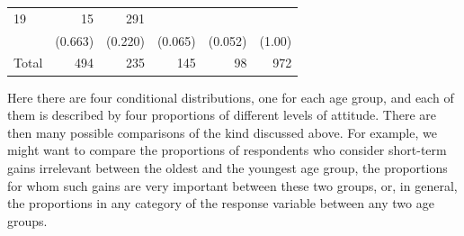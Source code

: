 \documentclass[11pt,a4paper,openany]{book}
\begin{document}
\begin{longtable}[]{@{}lrrrrr@{}}
\begin{minipage}[t]{0.09\columnwidth}
19\strut
\end{minipage} & \begin{minipage}[t]{0.09\columnwidth}\raggedleft\strut
15\strut
\end{minipage} & \begin{minipage}[t]{0.06\columnwidth}\raggedleft\strut
291\strut
\end{minipage}\tabularnewline
\begin{minipage}[t]{0.10\columnwidth}\raggedright\strut
\strut
\end{minipage} & \begin{minipage}[t]{0.40\columnwidth}\raggedleft\strut
(0.663)\strut
\end{minipage} & \begin{minipage}[t]{0.09\columnwidth}\raggedleft\strut
(0.220)\strut
\end{minipage} & \begin{minipage}[t]{0.09\columnwidth}\raggedleft\strut
(0.065)\strut
\end{minipage} & \begin{minipage}[t]{0.09\columnwidth}\raggedleft\strut
(0.052)\strut
\end{minipage} & \begin{minipage}[t]{0.06\columnwidth}\raggedleft\strut
(1.00)\strut
\end{minipage}\tabularnewline
\begin{minipage}[t]{0.10\columnwidth}\raggedright\strut
Total\strut
\end{minipage} & \begin{minipage}[t]{0.40\columnwidth}\raggedleft\strut
494\strut
\end{minipage} & \begin{minipage}[t]{0.09\columnwidth}\raggedleft\strut
235\strut
\end{minipage} & \begin{minipage}[t]{0.09\columnwidth}\raggedleft\strut
145\strut
\end{minipage} & \begin{minipage}[t]{0.09\columnwidth}\raggedleft\strut
98\strut
\end{minipage} & \begin{minipage}[t]{0.06\columnwidth}\raggedleft\strut
972\strut
\end{minipage}\tabularnewline
\bottomrule
\end{longtable}

Here there are four conditional distributions, one for each age group,
and each of them is described by four proportions of different levels of
attitude. There are then many possible comparisons of the kind discussed
above. For example, we might want to compare the proportions of
respondents who consider short-term gains irrelevant between the oldest
and the youngest age group, the proportions for whom such gains are very
important between these two groups, or, in general, the proportions in
any category of the response variable between any two age groups.
\end{document}
